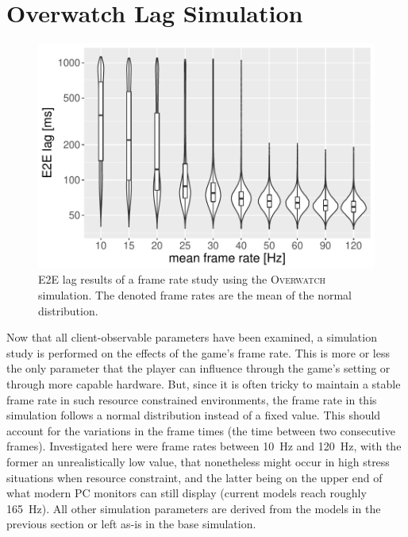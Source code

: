 \section{Overwatch Lag Simulation}
\label{sec:simulation}

\begin{figure}
	\centering
	\includegraphics[width=1.0\columnwidth]{images/lagsim.pdf}
	\caption{\acrshort{E2E} lag results of a frame rate study using the \textsc{Overwatch} simulation. The denoted frame rates are the mean of the normal distribution.}
\label{fig:lagsim}
\end{figure}


Now that all client-observable parameters have been examined, a simulation study is performed on the effects of the game's frame rate. This is more or less the only parameter that the player can influence through the game's setting or through more capable hardware. But, since it is often tricky to maintain a stable frame rate in such resource constrained environments, the frame rate in this simulation follows a normal distribution instead of a fixed value. This should account for the variations in the frame times (the time between two consecutive frames). Investigated here were frame rates between \SI{10}{\hertz} and \SI{120}{\hertz}, with the former an unrealistically low value, that nonetheless might occur in high stress situations when resource constraint, and the latter being on the upper end of what modern PC monitors can still display (current models reach roughly \SI{165}{\hertz}). All other simulation parameters are derived from the models in the previous section or left as-is in the base simulation. 

